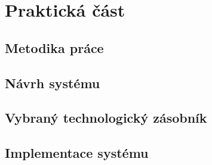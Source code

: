 \chapter{Praktická část}
\section{Metodika práce}
\section{Návrh systému}
\section{Vybraný technologický zásobník}
\section{Implementace systému}
